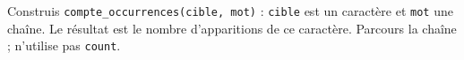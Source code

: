 Construis \texttt{compte\_occurrences(cible, mot)} : \texttt{cible} est un caractère et \texttt{mot} une chaîne. Le résultat est le nombre d'apparitions de ce caractère. Parcours la chaîne ; n'utilise pas \texttt{count}.
